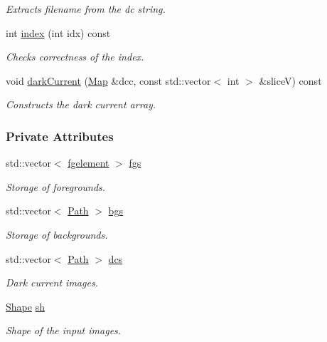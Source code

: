 \begin{DoxyCompactItemize}
\begin{DoxyCompactList}\small\item\em Extracts filename from the dc string. \item\end{DoxyCompactList}\item 
int \hyperlink{classAqSeries_a937895902e0442ce55456774c9e6459f}{index} (int idx) const 
\begin{DoxyCompactList}\small\item\em Checks correctness of the index. \item\end{DoxyCompactList}\item 
void \hyperlink{classAqSeries_ade81212133a63a374c14cd8c7c87977a}{darkCurrent} (\hyperlink{group__Types_ga8747378c016fc11d9ecbb98787248c25}{Map} \&dcc, const std::vector$<$ int $>$ \&sliceV) const 
\begin{DoxyCompactList}\small\item\em Constructs the dark current array. \item\end{DoxyCompactList}\end{DoxyCompactItemize}
\subsubsection*{Private Attributes}
\begin{DoxyCompactItemize}
\item 
std::vector$<$ \hyperlink{classAqSeries_aa4f8f07ad9fd3d046cb31d2d503f5355}{fgelement} $>$ \hyperlink{classAqSeries_a3b74470679bea53979f09deaa8811514}{fgs}
\begin{DoxyCompactList}\small\item\em Storage of foregrounds. \item\end{DoxyCompactList}\item 
std::vector$<$ \hyperlink{classPath}{Path} $>$ \hyperlink{classAqSeries_a49dccec360698a87334cede488149b31}{bgs}
\begin{DoxyCompactList}\small\item\em Storage of backgrounds. \item\end{DoxyCompactList}\item 
std::vector$<$ \hyperlink{classPath}{Path} $>$ \hyperlink{classAqSeries_a95036605b8b21a8e71b56959b171a0e7}{dcs}
\begin{DoxyCompactList}\small\item\em Dark current images. \item\end{DoxyCompactList}\item 
\hyperlink{group__Types_ga777964671cb4315ce8c56c920db031e3}{Shape} \hyperlink{classAqSeries_ab812affe8426bfd1e4fb81549cb16f71}{sh}
\begin{DoxyCompactList}\small\item\em Shape of the input images. \item\end{DoxyCompactList}\end{DoxyCompactItemize}

